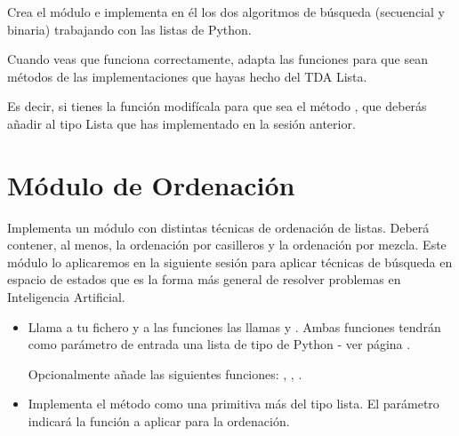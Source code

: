 Crea el módulo 
e implementa en él los dos algoritmos de búsqueda (secuencial y binaria)
trabajando con las listas de Python. 

Cuando veas que funciona correctamente, adapta las funciones para que sean métodos de las implementaciones que hayas hecho del TDA Lista.

Es decir, si tienes la función  modifícala para que sea el método  , que deberás añadir al tipo Lista que has implementado en la sesión anterior.




%



\separacion
\section{Módulo de Ordenación} \label{sec:moduloOrdenacion}

Implementa un módulo con distintas técnicas de ordenación de listas. 
Deberá contener, al menos, la ordenación por casilleros y la ordenación por mezcla.
Este módulo lo aplicaremos en la siguiente sesión para aplicar técnicas de búsqueda en espacio de estados que es la forma más general de resolver problemas en Inteligencia Artificial. 

\begin{itemize}
\item Llama a tu fichero  y a las funciones las llamas  y . Ambas funciones tendrán como parámetro de entrada una lista de tipo  de Python - ver página  \pageref{sec:mergeSort}.

Opcionalmente añade las siguientes funciones: , , .


\item Implementa el método  como una primitiva más del tipo lista. El parámetro  indicará la función a aplicar para la ordenación.
\end{itemize}


